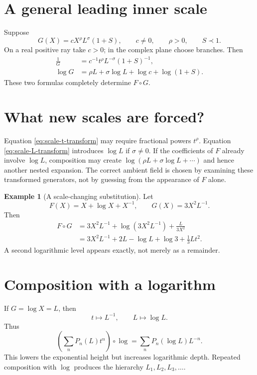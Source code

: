 \documentclass[11pt,oneside]{book}
\theoremstyle{definition}
\newtheorem{example}[theorem]{Example}
\theoremstyle{remark}
\newcommand{\precdom}{\prec}
\newcommand{\compose}{\mathbin{\circ}}
\begin{document}
\section{A general leading inner scale}
Suppose
\begin{equation}\label{eq:G-general-leading}
 G(X)=cX^\rho L^\sigma(1+S),
 \qquad c\ne0,
 \qquad \rho>0,
 \qquad S\precdom1.
\end{equation}
On a real positive ray take $c>0$; in the complex plane choose branches.
Then
\begin{align}
 \frac1G&=c^{-1}t^\rho L^{-\sigma}(1+S)^{-1},
 \label{eq:scale-t-transform}\\
 \log G&=\rho L+\sigma\log L+\log c+\log(1+S).
 \label{eq:scale-L-transform}
\end{align}
These two formulas completely determine $F\compose G$.

\section{What new scales are forced?}
Equation \eqref{eq:scale-t-transform} may require fractional powers $t^\rho$.
Equation \eqref{eq:scale-L-transform} introduces $\log L$ if $\sigma\ne0$.
If the coefficients of $F$ already involve $\log L$, composition may create
$\log(\rho L+\sigma\log L+\cdots)$ and hence another nested expansion.  The
correct ambient field is chosen by examining these transformed generators,
not by guessing from the appearance of $F$ alone.

\begin{example}[A scale-changing substitution]
Let
\[
 F(X)=X+\log X+X^{-1},
 \qquad
 G(X)=3X^2L^{-1}.
\]
Then
\begin{align*}
 F\compose G
 &=3X^2L^{-1}
 +\log(3X^2L^{-1})
 +\frac{L}{3X^2}\\
 &=3X^2L^{-1}+2L-\log L+\log3+\frac13Lt^2.
\end{align*}
A second logarithmic level appears exactly, not merely as a remainder.
\end{example}

\section{Composition with a logarithm}
If $G=\log X=L$, then
\[
 t\mapsto L^{-1},
 \qquad
 L\mapsto\log L.
\]
Thus
\[
 \left(\sum_nP_n(L)t^n\right)\compose\log
 =\sum_nP_n(\log L)L^{-n}.
\]
This lowers the exponential height but increases logarithmic depth.  Repeated
composition with $\log$ produces the hierarchy
$L_1,L_2,L_3,\ldots$.
\end{document}
